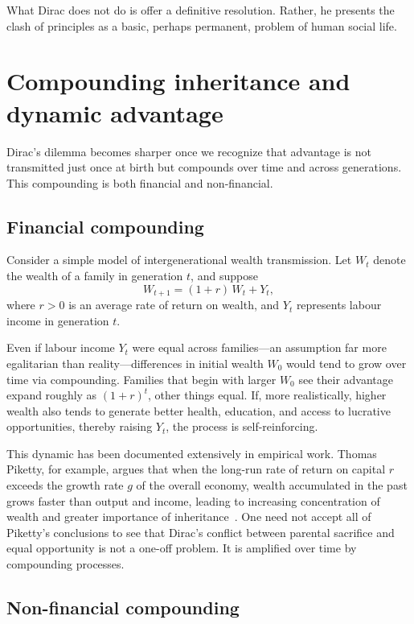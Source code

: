 \documentclass[%
  reprint,
  superscriptaddress,
  amsmath,amssymb,
  pra,
  floatfix,
  longbibliography
]{revtex4-2}
\begin{document}
What Dirac does not do is offer a definitive resolution.  Rather, he
presents the clash of principles as a basic, perhaps permanent, problem
of human social life.

\section{Compounding inheritance and dynamic advantage}

Dirac's dilemma becomes sharper once we recognize that advantage is not
transmitted just once at birth but compounds over time and across
generations.  This compounding is both financial and non-financial.

\subsection{Financial compounding}

Consider a simple model of intergenerational wealth transmission.
Let $W_t$ denote the wealth of a family in generation $t$, and suppose
\begin{equation}
  W_{t+1} = (1 + r)\, W_t + Y_t,
\end{equation}
where $r > 0$ is an average rate of return on wealth, and $Y_t$
represents labour income in generation $t$.

Even if labour income $Y_t$ were equal across families---an assumption
far more egalitarian than reality---differences in initial wealth
$W_0$ would tend to grow over time via compounding.  Families that
begin with larger $W_0$ see their advantage expand roughly as
$(1+r)^t$, other things equal.  If, more realistically, higher wealth
also tends to generate better health, education, and access to lucrative
opportunities, thereby raising $Y_t$, the process is self-reinforcing.

This dynamic has been documented extensively in empirical work.  Thomas
Piketty, for example, argues that when the long-run rate of return on
capital $r$ exceeds the growth rate $g$ of the overall economy, wealth
accumulated in the past grows faster than output and income, leading to
increasing concentration of wealth and greater importance of
inheritance~\cite{Piketty2014}.  One need not accept all of Piketty's
conclusions to see that Dirac's conflict between parental
sacrifice and equal opportunity is not a one-off problem.  It is
amplified over time by compounding processes.

\subsection{Non-financial compounding}
\end{document}
